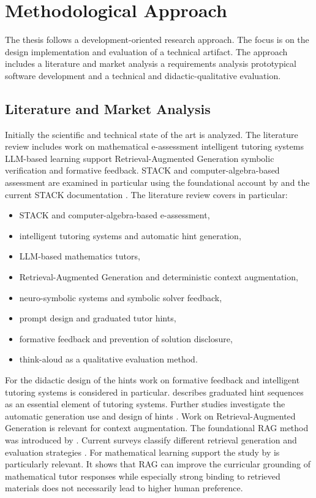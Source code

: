 \documentclass[11pt,a4paper,oneside,ngerman]{memoir}
\begin{document}
\chapter{Methodological Approach}
The thesis follows a development-oriented research approach. The focus is on the design implementation and evaluation of a technical artifact. The approach includes a literature and market analysis a requirements analysis prototypical software development and a technical and didactic-qualitative evaluation.
\section{Literature and Market Analysis}
Initially the scientific and technical state of the art is analyzed. The literature review includes work on mathematical e-assessment intelligent tutoring systems LLM-based learning support Retrieval-Augmented Generation symbolic verification and formative feedback. STACK and computer-algebra-based assessment are examined in particular using the foundational account by \textcite{sangwin2013computer} and the current STACK documentation \autocite{stackdocumentation}.
The literature review covers in particular:
\begin{itemize}
    \item STACK and computer-algebra-based e-assessment,
    \item intelligent tutoring systems and automatic hint generation,
    \item LLM-based mathematics tutors,
    \item Retrieval-Augmented Generation and deterministic context augmentation,
    \item neuro-symbolic systems and symbolic solver feedback,
    \item prompt design and graduated tutor hints,
    \item formative feedback and prevention of solution disclosure,
    \item think-aloud as a qualitative evaluation method.
\end{itemize}
For the didactic design of the hints work on formative feedback and intelligent tutoring systems is considered in particular. \textcite{vanlehn2006behavior} describes graduated hint sequences as an essential element of tutoring systems. Further studies investigate the automatic generation use and design of hints \autocite{stamper2010hints,razzaq2010hints,kochmar2022interventions,maniktala2020help}.
Work on Retrieval-Augmented Generation is relevant for context augmentation. The foundational RAG method was introduced by \textcite{lewis2020rag}. Current surveys classify different retrieval generation and evaluation strategies \autocite{gao2023ragsurvey,mialon2023augmented}. For mathematical learning support the study by \textcite{levonian2023ragmath} is particularly relevant. It shows that RAG can improve the curricular grounding of mathematical tutor responses while especially strong binding to retrieved materials does not necessarily lead to higher human preference.
\end{document}
